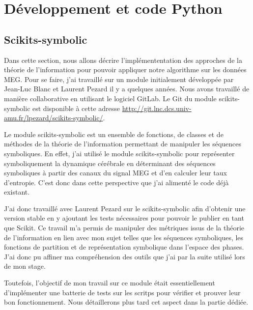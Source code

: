 \chapter{Développement et code Python}

\section{Scikits-symbolic}

\vspace{2ex}
Dans cette section, nous allons décrire l'implémententation des approches de la théorie de l'information pour pouvoir appliquer notre algorithme sur les données MEG. Pour se faire, j'ai travaillé sur un module initialement développée par Jean-Luc Blanc et Laurent Pezard il y a quelques années. Nous avons travaillé de manière collaborative en utilisant le logiciel GitLab. Le Git du module scikits-symbolic est disponible à cette adresse \href{http://git.lnc.dcs.univ-amu.fr/lpezard/scikits-symbolic/}{http://git.lnc.dcs.univ-amu.fr/lpezard/scikits-symbolic/}.

\vspace{2ex}
Le module scikits-symbolic est un ensemble de fonctions, de classes et de méthodes de la théorie de l'information permettant de manipuler les séquences symboliques. En effet, j'ai utilisé le module scikits-symbolic pour représenter symboliquement la dynamique cérébrale en déterminant des séquences symboliques à partir des canaux du signal MEG et d'en calculer leur taux d'entropie. C'est donc dans cette perspective que j'ai alimenté le code déjà existant.

\vspace{2ex}
J'ai donc travaillé avec Laurent Pezard sur le scikits-symbolic afin d'obtenir une version stable en y ajoutant les tests nécessaires pour pouvoir le publier en tant que Scikit. Ce travail m'a permis de manipuler des métriques issus de la théorie de l'information en lien avec mon sujet telles que les séquences symboliques, les fonctions de partition et de représentation symbolique dans l'espace des phases. J'ai donc pu affiner ma compréhension des outils que j'ai par la suite utilisé lors de mon stage.

\vspace{2ex}
Toutefois, l'objectif de mon travail sur ce module était essentiellement d'implémenter une batterie de tests sur les scritps pour vérifier et prouver leur bon fonctionnement. Nous détaillerons plus tard cet aspect dans la partie dédiée.

